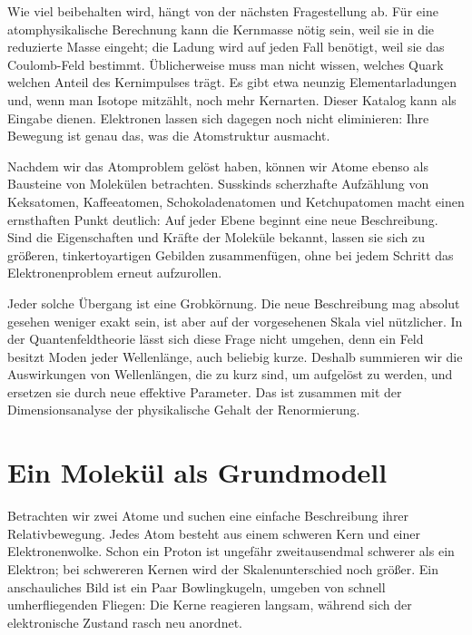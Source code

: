 Wie viel beibehalten wird, hängt von der nächsten Fragestellung ab. Für eine atomphysikalische Berechnung kann die Kernmasse nötig sein, weil sie in die reduzierte Masse eingeht; die Ladung wird auf jeden Fall benötigt, weil sie das Coulomb-Feld bestimmt. Üblicherweise muss man nicht wissen, welches Quark welchen Anteil des Kernimpulses trägt. Es gibt etwa neunzig Elementarladungen und, wenn man Isotope mitzählt, noch mehr Kernarten. Dieser Katalog kann als Eingabe dienen. Elektronen lassen sich dagegen noch nicht eliminieren: Ihre Bewegung ist genau das, was die Atomstruktur ausmacht.

Nachdem wir das Atomproblem gelöst haben, können wir Atome ebenso als Bausteine von Molekülen betrachten. Susskinds scherzhafte Aufzählung von Keksatomen, Kaffeeatomen, Schokoladenatomen und Ketchupatomen macht einen ernsthaften Punkt deutlich: Auf jeder Ebene beginnt eine neue Beschreibung. Sind die Eigenschaften und Kräfte der Moleküle bekannt, lassen sie sich zu größeren, tinkertoyartigen Gebilden zusammenfügen, ohne bei jedem Schritt das Elektronenproblem erneut aufzurollen.

Jeder solche Übergang ist eine Grobkörnung. Die neue Beschreibung mag absolut gesehen weniger exakt sein, ist aber auf der vorgesehenen Skala viel nützlicher. In der Quantenfeldtheorie lässt sich diese Frage nicht umgehen, denn ein Feld besitzt Moden jeder Wellenlänge, auch beliebig kurze. Deshalb summieren wir die Auswirkungen von Wellenlängen, die zu kurz sind, um aufgelöst zu werden, und ersetzen sie durch neue effektive Parameter. Das ist zusammen mit der Dimensionsanalyse der physikalische Gehalt der Renormierung.

\section{Ein Molekül als Grundmodell}

Betrachten wir zwei Atome und suchen eine einfache Beschreibung ihrer Relativbewegung. Jedes Atom besteht aus einem schweren Kern und einer Elektronenwolke. Schon ein Proton ist ungefähr zweitausendmal schwerer als ein Elektron; bei schwereren Kernen wird der Skalenunterschied noch größer. Ein anschauliches Bild ist ein Paar Bowlingkugeln, umgeben von schnell umherfliegenden Fliegen: Die Kerne reagieren langsam, während sich der elektronische Zustand rasch neu anordnet.

